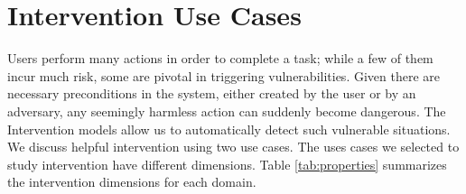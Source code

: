 \section{Intervention Use Cases}
Users perform many actions in order to complete a task; while a few of them incur much risk, some are pivotal in triggering vulnerabilities. 
Given there are necessary preconditions in the system, either created by the user or by an adversary, any seemingly harmless action can suddenly become dangerous. 
The Intervention models allow us to automatically detect such vulnerable situations.
We discuss helpful intervention using two use cases. 
The uses cases we selected to study intervention have different dimensions. 
Table \ref{tab:properties} summarizes the intervention dimensions for each domain.
\begin{table}[tpb]
\caption{Dimensions of intervention use cases}
\label{tab:properties}
\end{table}

